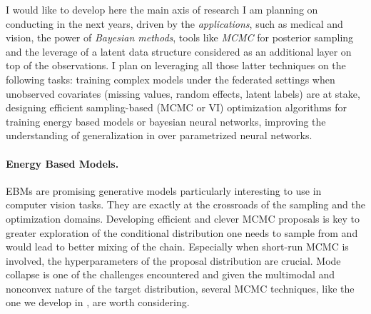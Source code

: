 \documentclass[twoside,11pt]{article}
\begin{document}
\vspace{0.25in}
\textbf{} 
\vspace{0.15in}

I would like to develop here the main axis of research I am planning on conducting in the next years, driven by the \emph{applications}, such as medical and vision, the power of \emph{Bayesian methods}, tools like \emph{MCMC} for posterior sampling and the leverage of a latent data structure considered as an additional layer on top of the observations. 
I plan on leveraging all those latter techniques on the following tasks: training complex models under the federated settings when unobserved covariates (missing values, random effects, latent labels) are at stake, designing efficient sampling-based (MCMC or VI) optimization algorithms for training energy based models or bayesian neural networks, improving the understanding of generalization in over parametrized neural networks.

\vspace{0.08in}
\paragraph{Energy Based Models.} 
EBMs are promising generative models particularly interesting to use in computer vision tasks.
They are exactly at the crossroads of the sampling and the optimization domains.
Developing efficient and clever MCMC proposals is key to greater exploration of the conditional distribution one needs to sample from and would lead to better mixing of the chain. 
Especially when short-run MCMC is involved, the hyperparameters of the proposal distribution are crucial.
Mode collapse is one of the challenges encountered and given the multimodal and nonconvex nature of the target distribution, several MCMC techniques, like the one we develop in \citep{karimi2020anila}, are worth considering.


\vspace{0.08in}
\end{document}
